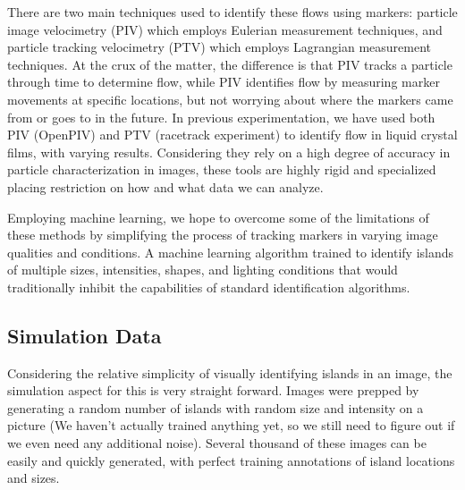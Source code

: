 \documentclass[prl,reprint,showpacs,floatfix,nofootinbib]{revtex4-1}
\begin{document}
There are two main techniques used to identify these flows using markers: particle image velocimetry (PIV) which employs Eulerian measurement techniques, and particle tracking velocimetry (PTV) which employs Lagrangian measurement techniques. At the crux of the matter, the difference is that PIV tracks a particle through time to determine flow, while PIV identifies flow by measuring marker movements at specific locations, but not worrying about where the markers came from or goes to in the future. In previous experimentation, we have used both PIV (OpenPIV) and PTV (racetrack experiment) to identify flow in liquid crystal films, with varying results. Considering they rely on a high degree of accuracy in particle characterization in images, these tools are highly rigid and specialized placing restriction on how and what data we can analyze. 

Employing machine learning, we hope to overcome some of the limitations of these methods by simplifying the process of tracking markers in varying image qualities and conditions. A machine learning algorithm trained to identify islands of multiple sizes, intensities, shapes, and lighting conditions that would traditionally inhibit the capabilities of standard identification algorithms. 

\subsection{Simulation Data}

Considering the relative simplicity of visually identifying islands in an image, the simulation aspect for this is very straight forward. Images were prepped by generating a random number of islands with random size and intensity on a picture (We haven't actually trained anything yet, so we still need to figure out if we even need any additional noise). Several thousand of these images can be easily and quickly generated, with perfect training annotations of island locations and sizes.
\end{document}
